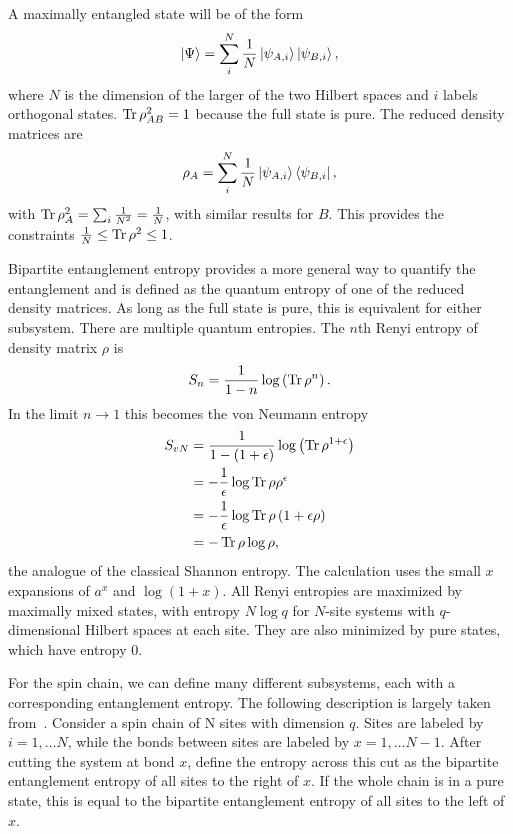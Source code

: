 A maximally entangled state will be of the form
\begin{align}
\left|\Psi\right\rangle = \sum_i^N\frac{1}{N}\left|\psi_{A,i}\right\rangle\left|\psi_{B,i}\right\rangle,
\end{align}
where $N$ is the dimension of the larger of the two Hilbert spaces and $i$ labels orthogonal states. $\operatorname{Tr}\rho_{AB}^2=1$ because the full state is pure. The reduced density matrices are
\begin{align}
\rho_A = \sum_i^N\frac{1}{N}\left|\psi_{A,i}\right\rangle\left\langle\psi_{B,i}\right|,
\end{align}
with $\operatorname{Tr}\rho_A^2 = \sum_i\frac{1}{N^2}=\frac{1}{N}$, with similar results for $B$. This provides the constraints $\frac{1}{N}\le\operatorname{Tr}\rho^2\le 1$. 

Bipartite entanglement entropy provides a more general way to quantify the entanglement and is defined as the quantum entropy of one of the reduced density matrices. As long as the full state is pure, this is equivalent for either subsystem. There are multiple quantum entropies. The $n$th Renyi entropy of density matrix $\rho$ is 
\begin{align}
S_n = \frac{1}{1-n}\log\left(\operatorname{Tr}\rho^n\right). \label{eqn:renyi}
\end{align}
In the limit $n\to1$ this becomes the von Neumann entropy 
\begin{align}
S_{vN} &= \frac{1}{1-(1+\epsilon)}\log\left(\operatorname{Tr}\rho^{1+\epsilon}\right) \nonumber\\
&= -\frac{1}{\epsilon}\log \operatorname{Tr} \rho \rho^{\epsilon}\nonumber\\
&= -\frac{1}{\epsilon}\log\operatorname{Tr}\rho\left(1+\epsilon\rho\right) \nonumber\\
&= -\operatorname{Tr}\rho\log\rho,
\end{align}
the analogue of the classical Shannon entropy. The calculation uses the small $x$ expansions of $a^x$ and $\log(1+x)$. All Renyi entropies are maximized by maximally mixed states, with entropy $N\log q$ for $N$-site systems with $q$-dimensional Hilbert spaces at each site. They are also minimized by pure states, which have entropy 0.

For the spin chain, we can define many different subsystems, each with a corresponding entanglement entropy. The following description is largely taken from~\cite{Nahum2017}. Consider a spin chain of N sites with dimension $q$. Sites are labeled by $i=1,\dots N$, while the bonds between sites are labeled by $x = 1,\dots N-1$. After cutting the system at bond $x$, define the entropy across this cut as the bipartite entanglement entropy of all sites to the right of $x$. If the whole chain is in a pure state, this is equal to the bipartite entanglement entropy of all sites to the left of $x$.

